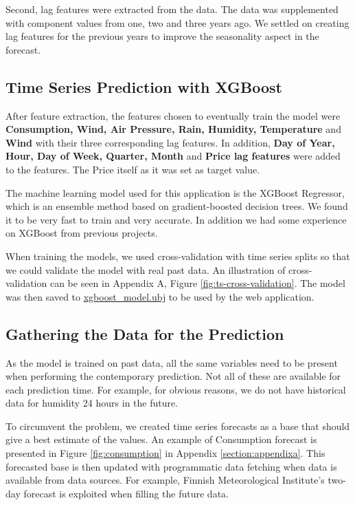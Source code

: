 \documentclass{article}
\begin{document}
Second, lag features were extracted from the data. The data was supplemented with component values from one, two and three years ago. We settled on creating lag features for the previous years to improve the seasonality aspect in the forecast.

\subsection{Time Series Prediction with XGBoost}
\label{subsection:xgboost}

After feature extraction, the features chosen to eventually train the model were \textbf{Consumption, Wind, Air Pressure, Rain, Humidity, Temperature} and \textbf{Wind} with their three corresponding lag features. In addition, \textbf{Day of Year, Hour, Day of Week, Quarter, Month} and \textbf{Price lag features} were added to the features. The Price itself as it was set as target value.

The machine learning model used for this application is the XGBoost Regressor, which is an ensemble method based on gradient-boosted decision trees. We found it to be very fast to train and very accurate. In addition we had some experience on XGBoost from previous projects. 

When training the models, we used cross-validation with time series splits so that we could validate the model with real past data. An illustration of cross-validation can be seen in Appendix A, Figure \ref{fig:ts-cross-validation}. The model was then saved to \href{https://github.com/IDS-mini/electricity/blob/main/models/xgboost_model.ubj}{xgboost\_model.ubj} to be used by the web application.

\subsection{Gathering the Data for the Prediction}
\label{subsection:datafilling}

As the model is trained on past data, all the same variables need to be present when performing the contemporary prediction. Not all of these are available for each prediction time. For example, for obvious reasons, we do not have historical data for humidity 24 hours in the future.

To circumvent the problem, we created time series forecasts as a base that should give a best estimate of the values. An example of Consumption forecast is presented in Figure \ref{fig:consumption} in Appendix \ref{section:appendixa}. This forecasted base is then updated with programmatic data fetching when data is available from data sources. For example, Finnish Meteorological Institute's two-day forecast is exploited when filling the future data.
\end{document}
